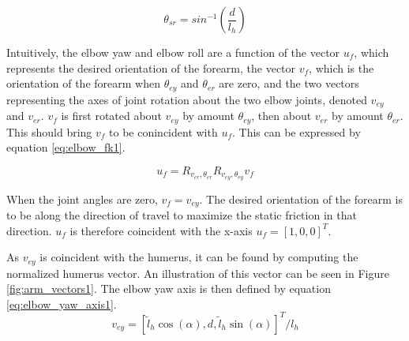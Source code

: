 \begin{equation}
	\theta_{sr} = sin^{-1} \left( \frac{d}{l_h} \right ) \label{eq:shoulder_roll1}
\end{equation}


Intuitively, the elbow yaw and elbow roll are a function of the vector $u_f$, which represents the desired 
orientation of the forearm, the vector $v_f$, which is the orientation of the forearm when 
$\theta_{ey}$ and $\theta_{er}$ are zero, and the two vectors representing the axes of joint 
rotation about the two elbow joints,
denoted $v_{ey}$ and $v_{er}$. $v_f$ is first rotated about $v_{ey}$ by amount $\theta_{ey}$, then about
$v_{er}$ by amount $\theta_{er}$. This should bring $v_f$ to be conincident with $u_f$.
This can be expressed by equation \ref{eq:elbow_fk1}.

\begin{equation}
	u_f = R_{v_{er}, \theta_{er}} R_{v_{ey}, \theta_{ey}} v_f \label{eq:elbow_fk1}
\end{equation}

When the joint angles are zero, $v_f = v_{ey}$.
The desired orientation of the forearm is to be along the direction of travel to maximize the static friction
in that direction. $u_f$ is therefore coincident with the x-axis $u_f = [1, 0, 0]^T$.


As $v_{ey}$ is coincident with the humerus, it can be found by computing the normalized humerus vector.
An illustration of this vector can be seen in Figure \ref{fig:arm_vectors1}. The elbow yaw axis is then defined
by equation \ref{eq:elbow_yaw_axis1}.
\begin{equation}
	v_{ey} = [\tilde l_h \cos(\alpha), d, \tilde l_h \sin(\alpha)]^T / l_h \label{eq:elbow_yaw_axis1}
\end{equation}

